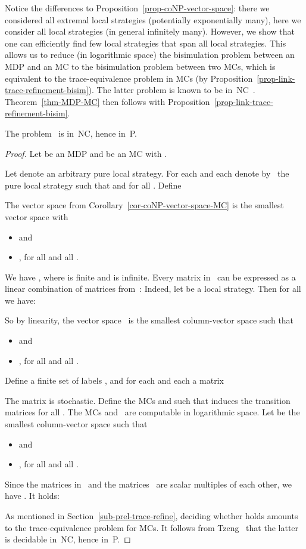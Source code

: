 Notice the differences to Proposition~\ref{prop-coNP-vector-space}: there we considered all extremal local strategies (potentially exponentially many), here we consider all local strategies (in general infinitely many).
However, we show that one can efficiently find few local strategies that span all local strategies.
This allows us to reduce (in logarithmic space) the bisimulation problem between an MDP and an MC to the bisimulation problem between two MCs,
which is equivalent to the trace-equivalence problem in MCs (by Proposition~\ref{prop-link-trace-refinement-bisim}).
The latter problem is known to be in~{\sf NC}~\cite{Tzeng96}.
Theorem~\ref{thm-MDP-MC} then follows with Proposition~\ref{prop-link-trace-refinement-bisim}.

\begin{thm}\label{thm-MDP-MC}
The problem~ is in~{\sf NC}, hence in~{\sf P}.
\end{thm}

\begin{proof}
Let  be an MDP
and  be an MC with .

Let  denote an arbitrary pure local strategy.
For each  and each  denote by~ the pure local strategy such that  and  for all .
Define

The vector space  from Corollary~\ref{cor-coNP-vector-space-MC} is the smallest vector space with
\begin{itemize}
\item
 and
\item , for all  and all .
\end{itemize}

\noindent
We have , where  is finite and  is infinite.
Every matrix in~ can be expressed as a linear combination of matrices from~:
Indeed, let  be a local strategy.
Then for all  we have:

So by linearity, the vector space~ is the smallest column-vector space such that
\begin{itemize}
\item
 and
\item , for all  and all .
\end{itemize}

\noindent
Define a finite set of labels , and for each  and each  a matrix

The matrix  is stochastic.
Define the MCs 
and 
such that  induces the transition matrices  for all .
The MCs  and~ are computable in logarithmic space.
Let  be the smallest column-vector space such that
\begin{itemize}
\item
 and
\item , for all  and all .
\end{itemize}
Since the matrices in~ and the matrices~ are scalar multiples of each other, we have .
It holds:

As mentioned in Section~\ref{sub-prel-trace-refine},
deciding whether  holds amounts to the trace-equivalence problem for MCs.
It follows from Tzeng~\cite{Tzeng96} that the latter is decidable in~{\sf NC}, hence in~{\sf P}.
\end{proof}

